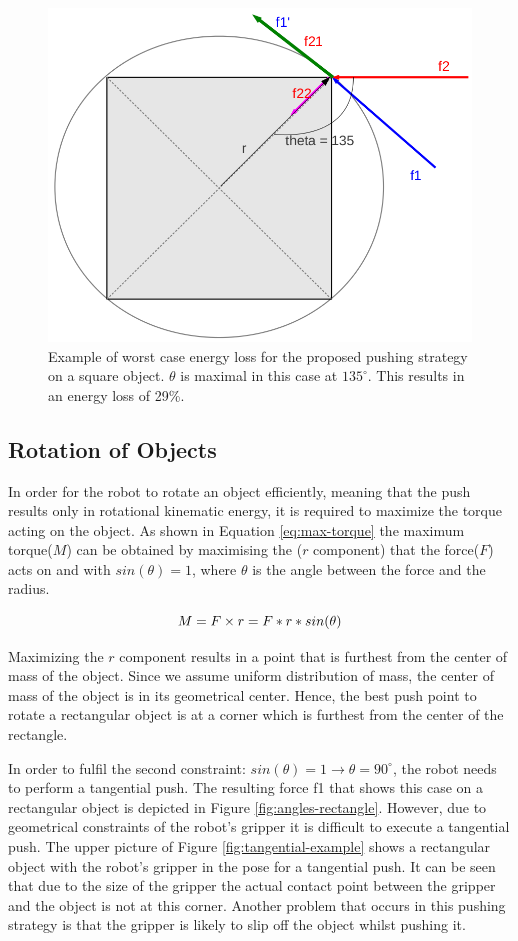 \begin{figure}
\centering
 

\includegraphics[width=0.5\columnwidth]{figures/square-angle.png}


\caption{Example of worst case energy loss for the proposed pushing strategy on a square object. $\theta$ is maximal in this case at $135 ^\circ$. This results in an energy loss of 29\%.  }
\label{fig:angles-square}
\end{figure}

\subsection{Rotation of Objects}
In order for the robot to rotate an object efficiently, meaning that the push results only in rotational kinematic energy, it is required to maximize the torque acting on the object. As shown in Equation \ref{eq:max-torque} the maximum torque($M$) can be obtained by maximising the ($r$ component) that the force($F$) acts on and with $sin(\theta) = 1$, where $\theta$ is the angle between the force and the radius.

\begin{equation}
M =  F \times r = F*r*sin(\theta)\\
\label{eq:max-torque}
\end{equation}

Maximizing the $r$ component results in a point that is furthest from the center of mass of the object. Since we assume uniform distribution of mass, the center of mass of the object is in its geometrical center. Hence, the best push point to rotate a rectangular object is at a corner which is furthest from the center of the rectangle.

In order to fulfil the second constraint: $sin(\theta) = 1 \to \theta = 90 ^\circ$, the robot needs to perform a tangential push. The resulting force f1 that shows this case on a rectangular object is depicted in Figure \ref{fig:angles-rectangle}. However, due to geometrical constraints of the robot's gripper it is difficult to execute a tangential push. The upper picture of Figure \ref{fig:tangential-example} shows a rectangular object with the robot's gripper in the pose for a tangential push. It can be seen that due to the size of the gripper the actual contact point between the gripper and the object is not at this corner. Another problem that occurs in this pushing strategy is that the gripper is likely to slip off the object whilst pushing it.

